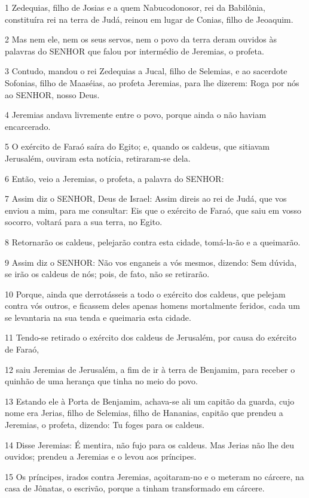 \par 1 Zedequias, filho de Josias e a quem Nabucodonosor, rei da Babilônia, constituíra rei na terra de Judá, reinou em lugar de Conias, filho de Jeoaquim.
\par 2 Mas nem ele, nem os seus servos, nem o povo da terra deram ouvidos às palavras do SENHOR que falou por intermédio de Jeremias, o profeta.
\par 3 Contudo, mandou o rei Zedequias a Jucal, filho de Selemias, e ao sacerdote Sofonias, filho de Maaséias, ao profeta Jeremias, para lhe dizerem: Roga por nós ao SENHOR, nosso Deus.
\par 4 Jeremias andava livremente entre o povo, porque ainda o não haviam encarcerado.
\par 5 O exército de Faraó saíra do Egito; e, quando os caldeus, que sitiavam Jerusalém, ouviram esta notícia, retiraram-se dela.
\par 6 Então, veio a Jeremias, o profeta, a palavra do SENHOR:
\par 7 Assim diz o SENHOR, Deus de Israel: Assim direis ao rei de Judá, que vos enviou a mim, para me consultar: Eis que o exército de Faraó, que saiu em vosso socorro, voltará para a sua terra, no Egito.
\par 8 Retornarão os caldeus, pelejarão contra esta cidade, tomá-la-ão e a queimarão.
\par 9 Assim diz o SENHOR: Não vos enganeis a vós mesmos, dizendo: Sem dúvida, se irão os caldeus de nós; pois, de fato, não se retirarão.
\par 10 Porque, ainda que derrotásseis a todo o exército dos caldeus, que pelejam contra vós outros, e ficassem deles apenas homens mortalmente feridos, cada um se levantaria na sua tenda e queimaria esta cidade.
\par 11 Tendo-se retirado o exército dos caldeus de Jerusalém, por causa do exército de Faraó,
\par 12 saiu Jeremias de Jerusalém, a fim de ir à terra de Benjamim, para receber o quinhão de uma herança que tinha no meio do povo.
\par 13 Estando ele à Porta de Benjamim, achava-se ali um capitão da guarda, cujo nome era Jerias, filho de Selemias, filho de Hananias, capitão que prendeu a Jeremias, o profeta, dizendo: Tu foges para os caldeus.
\par 14 Disse Jeremias: É mentira, não fujo para os caldeus. Mas Jerias não lhe deu ouvidos; prendeu a Jeremias e o levou aos príncipes.
\par 15 Os príncipes, irados contra Jeremias, açoitaram-no e o meteram no cárcere, na casa de Jônatas, o escrivão, porque a tinham transformado em cárcere.
